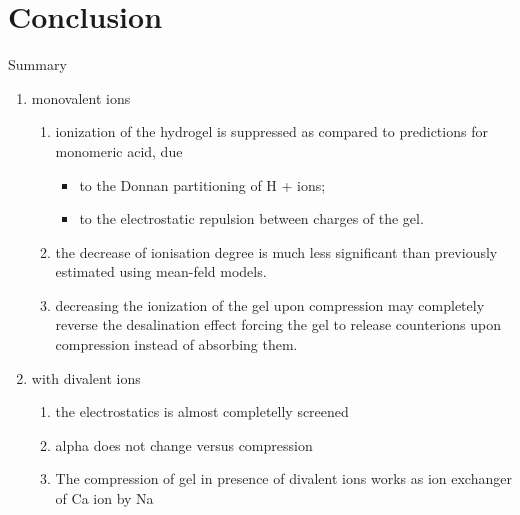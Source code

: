 \documentclass[10pt]{beamer}
\newcommand{\cs}{c_{\mathrm{s}}}
\begin{document}
\begin{frame}{Desalination in \{$\cs$, $N$\} coordinates.}
	\begin{figure}[t]
		{\texttt{[image: \{figures/results\_2]}.pdf}}
	\end{figure}
\end{frame}






\section{Conclusion}

\begin{frame}{Summary}
\begin{enumerate}
\item monovalent ions
	\begin{enumerate}
		\item ionization of the hydrogel is suppressed as compared to predictions for monomeric acid, due 
			\begin{itemize}
				\item to the Donnan partitioning of H + ions; 
				\item to the electrostatic repulsion between charges of the gel.
			\end{itemize}
		\item the decrease of ionisation degree is much less significant than previously estimated using mean-feld models.
		\item decreasing the ionization of the gel upon compression may completely reverse the desalination effect forcing the gel to  release counterions upon compression instead of absorbing them.
	\end{enumerate}
\item with divalent ions
	\begin{enumerate}
		\item the electrostatics is almost completelly screened
		\item alpha does not change versus compression
		\item The compression of gel in presence of divalent ions works as ion exchanger of Ca ion by Na
	\end{enumerate}
\end{enumerate}
\end{frame}
\end{document}
